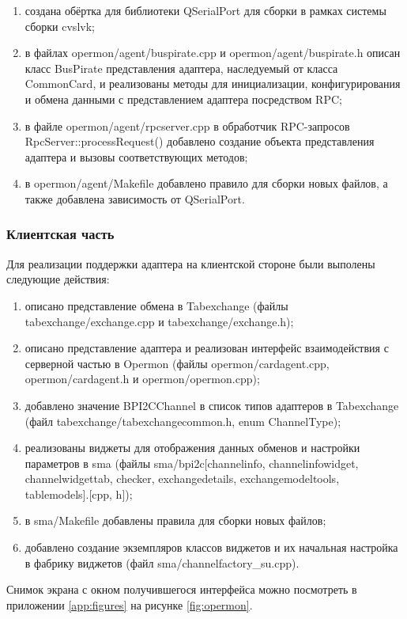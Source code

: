 \begin{enumerate}
 \item создана обёртка для библиотеки QSerialPort для сборки в рамках системы сборки cvslvk;
 \item в файлах opermon/agent/buspirate.cpp и opermon/agent/buspirate.h описан класс BusPirate представления адаптера, наследуемый от класса CommonCard, и реализованы методы для инициализации, конфигурирования и обмена данными с представлением адаптера посредством RPC;
 \item в файле opermon/agent/rpcserver.cpp в обработчик RPC-запросов RpcServer::processRequest() добавлено создание объекта представления адаптера и вызовы соответствующих методов;
 \item в opermon/agent/Makefile добавлено правило для сборки новых файлов, а также добавлена зависимость от QSerialPort.
\end{enumerate}


\subsubsection{Клиентская часть}

\label{client_implementation}

Для реализации поддержки адаптера на клиентской стороне были выполены следующие действия:

\begin{enumerate}
 \item описано представление обмена в Tabexchange (файлы tabexchange/exchange.cpp и tabexchange/exchange.h);
 \item описано представление адаптера и реализован интерфейс взаимодействия с серверной частью в Opermon (файлы opermon/cardagent.cpp, opermon/cardagent.h и opermon/opermon.cpp);
 \item добавлено значение BPI2CChannel в список типов адаптеров в Tabexchange (файл tabexchange/tabexchangecommon.h, enum ChannelType);
 \item реализованы виджеты для отображения данных обменов и настройки параметров в sma (файлы sma/bpi2c[channelinfo, channelinfowidget, channelwidgettab, checker, exchangedetails, exchangemodeltools, tablemodels].[cpp, h]);
 \item в sma/Makefile добавлены правила для сборки новых файлов;
 \item добавлено создание экземпляров классов виджетов и их начальная настройка в фабрику виджетов (файл sma/channelfactory\_su.cpp).
\end{enumerate}


Снимок экрана с окном получившегося интерфейса можно посмотреть в приложении \ref{app:figures} на рисунке \ref{fig:opermon}.